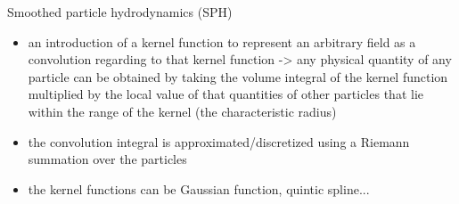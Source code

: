 \documentclass[12pt]{report}
\renewcommand{\_}{\kern-1.5pt\textunderscore\kern-1.5pt}
\begin{document}
Smoothed particle hydrodynamics (SPH)\par

\begin{itemize}
	\item an introduction of a kernel function to represent an arbitrary field as a convolution regarding to that kernel function -> any physical quantity of any particle can be obtained by taking the volume integral of the kernel function multiplied by the local value of that quantities of other particles that lie within the range of the kernel (the characteristic radius)\par

	\item the convolution integral is approximated/discretized using a Riemann summation over the particles\par

	\item the kernel functions can be Gaussian function, quintic spline...
\end{itemize}\par


\printbibliography
\end{document}
